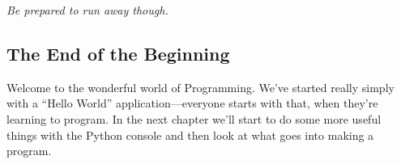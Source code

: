 \noindent
\emph{Be prepared to run away though.}

\subsection*{\color{BrickRed}The End of the Beginning}

Welcome to the wonderful world of Programming.  We've started really simply with a ``Hello World'' application---everyone starts with that, when they're learning to program.
In the next chapter we'll start to do some more useful things with the Python console and then look at what goes into making a program.

\newpage

